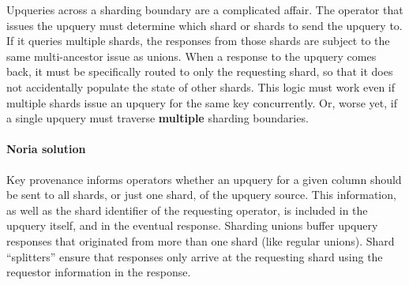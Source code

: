 Upqueries across a sharding boundary are a complicated affair. The
operator that issues the upquery must determine which shard or shards to
send the upquery to. If it queries multiple shards, the responses from
those shards are subject to the same multi-ancestor issue as unions.
When a response to the upquery comes back, it must be specifically
routed to only the requesting shard, so that it does not accidentally
populate the state of other shards. This logic must work even if
multiple shards issue an upquery for the same key concurrently. Or,
worse yet, if a single upquery must traverse \textbf{multiple} sharding
boundaries.

\paragraph{Noria solution}
Key provenance informs operators whether an upquery for a given column should be
sent to all shards, or just one shard, of the upquery source. This information,
as well as the shard identifier of the requesting operator, is included in the
upquery itself, and in the eventual response. Sharding unions buffer upquery
responses that originated from more than one shard (like regular unions). Shard
``splitters'' ensure that responses only arrive at the requesting shard using
the requestor information in the response.
